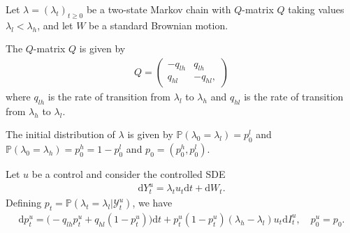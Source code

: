 \documentclass[10pt]{article}
\numberwithin{equation}{part}
\renewcommand{\P}{\mathbb{P}}
\newcommand{\cY}{\mathcal{Y}}
\newcommand{\rd}{\mathrm{d}}
\theoremstyle{plain}
\theoremstyle{definition}
\begin{document}
Let $\lambda = (\lambda_{t})_{t\geq0}$ be a two-state Markov chain with $Q$-matrix $Q$ taking
values $\lambda_{l} < \lambda_{h}$, and let $W$ be a standard Brownian motion.

The $Q$-matrix $Q$ is given by
\begin{align*}
    Q = \begin{pmatrix}
        -q_{lh} & q_{lh} \\
        q_{hl} & -q_{hl},
    \end{pmatrix}
\end{align*}
where $q_{lh}$ is the rate of transition from $\lambda_{l}$ to $\lambda_{h}$ and $q_{hl}$ is the rate of transition from $\lambda_{h}$ to $\lambda_{l}$.

The initial distribution of $\lambda$ is given by $\P(\lambda_{0} = \lambda_{l}) = p^{l}_{0}$ and
$\P(\lambda_{0} = \lambda_{h}) = p^{h}_{0} = 1 - p^{l}_{0}$ and $p_{0} = (p^{h}_{0}, p^{l}_{0})$.

Let $u$ be a control and consider the controlled SDE
\begin{align*}
    \rd Y^{u}_{t} = \lambda_{t} u_{t} \rd t + \rd W_{t}.
\end{align*}
Defining $p_{t} = \P(\lambda_{t} = \lambda_{l} | \cY^{u}_{t})$, we have
\begin{align}
    \rd p^{u}_{t} = \bigl(-q_{lh} p^{u}_{t} + q_{hl} (1 - p^{u}_{t})\bigr) \rd t
    + p^{u}_{t}(1 - p^{u}_{t})(\lambda_{h} - \lambda_{l}) u_{t} \rd I^{u}_{t},
    \quad p^{u}_{0} = p_{0}.
\end{align}
\end{document}
